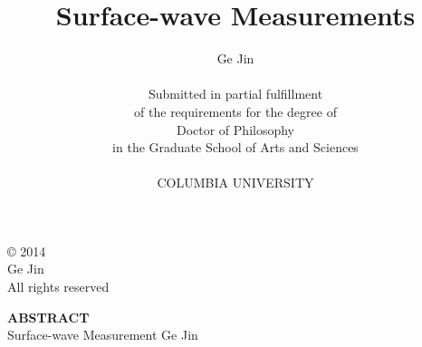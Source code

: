 \begin{titlepage}
\singlespacing
\title{Surface-wave Measurements}
\author{Ge Jin\\
\vspace{272pt}\\
Submitted in partial fulfillment \\
of the requirements
for the degree of \\
Doctor of Philosophy \\
in the Graduate School of Arts and Sciences \\
\vspace{24pt}\\
COLUMBIA UNIVERSITY \\}
\maketitle
\end{titlepage}

\vspace{10cm}
\singlespacing
\null
\begin{center}
\begin{bottompar}
{\large \copyright  \hspace{1mm} 2014 \\
Ge Jin\\
All rights reserved}
\end{bottompar}

\doublespacing
\large
{\bf ABSTRACT}\\
Surface-wave Measurement
Ge Jin
\end{center}
\doublespacing

\raggedbottom
\pagebreak

\frontmatter

\pagestyle{fancy}
\chead{}
\lhead{}
\rhead{}
\cfoot{\thepage}
\renewcommand{\headrulewidth}{0pt}

\tableofcontents
{}
\raggedbottom
\pagebreak

\listoffigures
{}
\raggedbottom
\pagebreak

